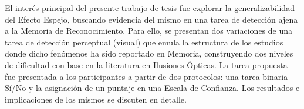 El interés principal del presente trabajo de tesis fue explorar la generalizabilidad del Efecto Espejo, buscando evidencia del mismo en una tarea de detección ajena a la Memoria de Reconocimiento. Para ello, se presentan dos variaciones de una tarea de detección perceptual (visual) que emula la estructura de los estudios donde dicho fenómenos ha sido reportado en Memoria, construyendo dos niveles de dificultad con base en la literatura en Ilusiones Ópticas. La tarea propuesta fue presentada a los participantes a partir de dos protocolos: una tarea binaria Sí/No y la asignación de un puntaje en una Escala de Confianza. Los resultados e implicaciones de los mismos se discuten en detalle.\\